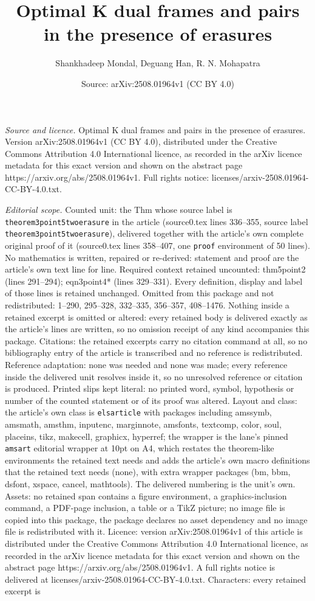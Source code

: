 \documentclass[10pt,a4paper]{amsart}
\title[Optimal K dual frames and pairs in the presence of erasures]{Optimal K dual frames and pairs in the presence of erasures}
\author{Shankhadeep Mondal, Deguang Han, R. N. Mohapatra}
\date{Source: arXiv:2508.01964v1 (CC BY 4.0)}
\begin{document}
\maketitle

\noindent\emph{Source and licence.} Optimal K dual frames and pairs in the presence of erasures. Version arXiv:2508.01964v1 (CC BY 4.0), distributed under the Creative Commons Attribution 4.0 International licence, as recorded in the arXiv licence metadata for this exact version and shown on the abstract page https://arxiv.org/abs/2508.01964v1. Full rights notice: licenses/arxiv-2508.01964-CC-BY-4.0.txt.\par\smallskip

\noindent\textit{Editorial scope.} Counted unit: the Thm whose source label is \texttt{theorem3point5twoerasure} in the article (source0.tex lines 336--355, source label \texttt{theorem3point5twoerasure}), delivered together with the article's own complete original proof of it (source0.tex lines 358--407, one \texttt{proof} environment of 50 lines). No mathematics is written, repaired or re-derived: statement and proof are the article's own text line for line. Required context retained uncounted: thm5point2 (lines 291--294); eqn3point4* (lines 329--331). Every definition, display and label of those lines is retained unchanged. Omitted from this package and not redistributed: 1--290, 295--328, 332--335, 356--357, 408--1476. Nothing inside a retained excerpt is omitted or altered: every retained body is delivered exactly as the article's lines are written, so no omission receipt of any kind accompanies this package. Citations: the retained excerpts carry no citation command at all, so no bibliography entry of the article is transcribed and no reference is redistributed. Reference adaptation: none was needed and none was made; every reference inside the delivered unit resolves inside it, so no unresolved reference or citation is produced. Printed slips kept literal: no printed word, symbol, hypothesis or number of the counted statement or of its proof was altered. Layout and class: the article's own class is \texttt{elsarticle} with packages including amssymb, amsmath, amsthm, inputenc, marginnote, amsfonts, textcomp, color, soul, placeins, tikz, makecell, graphicx, hyperref; the wrapper is the lane's pinned \texttt{amsart} editorial wrapper at 10pt on A4, which restates the theorem-like environments the retained text needs and adds the article's own macro definitions that the retained text needs (none), with extra wrapper packages (bm, bbm, dsfont, xspace, cancel, mathtools). The delivered numbering is the unit's own. Assets: no retained span contains a figure environment, a graphics-inclusion command, a PDF-page inclusion, a table or a TikZ picture; no image file is copied into this package, the package declares no asset dependency and no image file is redistributed with it. Licence: version arXiv:2508.01964v1 of this article is distributed under the Creative Commons Attribution 4.0 International licence, as recorded in the arXiv licence metadata for this exact version and shown on the abstract page https://arxiv.org/abs/2508.01964v1. A full rights notice is delivered at licenses/arxiv-2508.01964-CC-BY-4.0.txt. Characters: every retained excerpt is 
\end{document}
